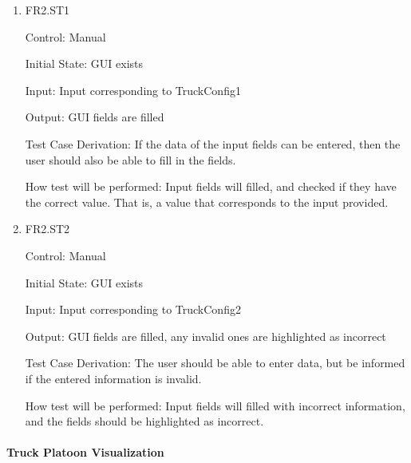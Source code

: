 \documentclass[12pt, titlepage]{article}
\begin{document}
\begin{enumerate}

  \item{FR2.ST1\\}

  Control: Manual

  Initial State: GUI exists

  Input: Input corresponding to TruckConfig1

  Output: GUI fields are filled

  Test Case Derivation: If the data of the input fields can be entered, then the user
  should also be able to fill in the fields.

  How test will be performed: Input fields will filled, and checked if they have the
  correct value. That is, a value that corresponds to the input provided.

  \item{FR2.ST2\\}

  Control: Manual

  Initial State: GUI exists

  Input: Input corresponding to TruckConfig2

  Output: GUI fields are filled, any invalid ones are highlighted as incorrect

  Test Case Derivation: The user should be able to enter data, but be informed if the
  entered information is invalid.

  How test will be performed: Input fields will filled with incorrect information, 
  and the fields should be highlighted as incorrect.

\end{enumerate}

\paragraph{Truck Platoon Visualization}
\end{document}
